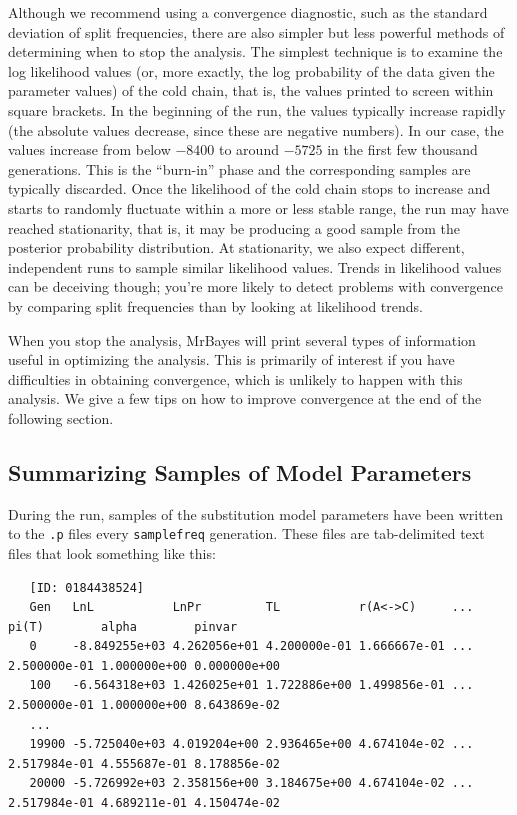 \documentclass[12pt]{book}
\newcommand{\ttt}[1]{\texttt{#1}}
\begin{document}
Although we recommend using a convergence diagnostic, such as the standard deviation of split
frequencies, there are also simpler but less powerful methods of determining when to stop the
analysis. The simplest technique is to examine the log likelihood values (or, more exactly, the log
probability of the data given the parameter values) of the cold chain, that is, the values printed
to screen within square brackets. In the beginning of the run, the values typically increase
rapidly (the absolute values decrease, since these are negative numbers). In our case, the values
increase from below $-8400$ to around $-5725$ in the first few thousand generations. This is the
``burn-in'' phase and the corresponding samples are typically discarded. Once the likelihood of
the cold chain stops to increase and starts to randomly fluctuate within a more or less stable
range, the run may have reached stationarity, that is, it may be producing a good sample from the
posterior probability distribution. At stationarity, we also expect different, independent runs to
sample similar likelihood values. Trends in likelihood values can be deceiving though; you're more
likely to detect problems with convergence by comparing split frequencies than by looking at
likelihood trends.

When you stop the analysis, MrBayes will print several types of information useful in optimizing
the analysis. This is primarily of interest if you have difficulties in obtaining convergence,
which is unlikely to happen with this analysis. We give a few tips on how to improve convergence at
the end of the following section.

\subsection{Summarizing Samples of Model Parameters}

During the run, samples of the substitution model parameters have been written to the \ttt{.p}
files every \ttt{samplefreq} generation. These files are tab-delimited text files that look
something like this:

\begin{singlespacing}
\scriptsize
\begin{verbatim}
   [ID: 0184438524]
   Gen   LnL           LnPr         TL           r(A<->C)     ... pi(T)        alpha        pinvar
   0     -8.849255e+03 4.262056e+01 4.200000e-01 1.666667e-01 ... 2.500000e-01 1.000000e+00 0.000000e+00
   100   -6.564318e+03 1.426025e+01 1.722886e+00 1.499856e-01 ... 2.500000e-01 1.000000e+00 8.643869e-02
   ...
   19900 -5.725040e+03 4.019204e+00 2.936465e+00 4.674104e-02 ... 2.517984e-01 4.555687e-01 8.178856e-02
   20000 -5.726992e+03 2.358156e+00 3.184675e+00 4.674104e-02 ... 2.517984e-01 4.689211e-01 4.150474e-02
\end{verbatim}
\normalsize
\end{singlespacing}
\end{document}
